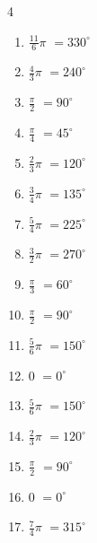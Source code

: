 \begin{multicols}{4}
\begin{enumerate}
  \item $\displaystyle \frac{11}{6}\pi$
        $\displaystyle =330^{\circ}$

  \item $\displaystyle \frac{4}{3}\pi$
        $\displaystyle =240^{\circ}$

  \item $\displaystyle \frac{\pi}{2}$
        $\displaystyle =90^{\circ}$

  \item $\displaystyle \frac{\pi}{4}$
        $\displaystyle =45^{\circ}$

  \item $\displaystyle \frac{2}{3}\pi$
        $\displaystyle =120^{\circ}$

  \item $\displaystyle \frac{3}{4}\pi$
        $\displaystyle =135^{\circ}$

  \item $\displaystyle \frac{5}{4}\pi$
        $\displaystyle =225^{\circ}$

  \item $\displaystyle \frac{3}{2}\pi$
        $\displaystyle =270^{\circ}$

  \item $\displaystyle \frac{\pi}{3}$
        $\displaystyle =60^{\circ}$

  \item $\displaystyle \frac{\pi}{2}$
        $\displaystyle =90^{\circ}$

\columnbreak %

  \item $\displaystyle \frac{5}{6}\pi$
        $\displaystyle =150^{\circ}$

  \item $\displaystyle 0$
        $\displaystyle =0^{\circ}$

  \item $\displaystyle \frac{5}{6}\pi$
        $\displaystyle =150^{\circ}$

  \item $\displaystyle \frac{2}{3}\pi$
        $\displaystyle =120^{\circ}$

  \item $\displaystyle \frac{\pi}{2}$
        $\displaystyle =90^{\circ}$

  \item $\displaystyle 0$
        $\displaystyle =0^{\circ}$

  \item $\displaystyle \frac{7}{4}\pi$
        $\displaystyle =315^{\circ}$


\end{enumerate}
\end{multicols}
